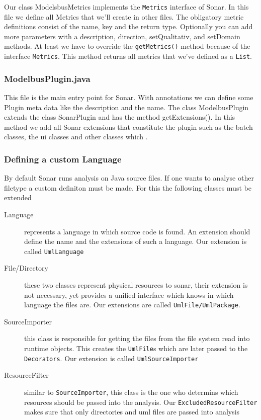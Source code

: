 Our class ModelsbusMetrics implements the \texttt{Metrics} interface of
Sonar. In this file we define all Metrics that we'll create in other
files. The obligatory metric definitions consist of the name, key and
the return type. Optionally you can add more parameters with a
description, direction, setQualitativ, and setDomain methods. At least
we have to override the \texttt{getMetrics()} method because of the interface
\texttt{Metrics}. This method returns all metrics that we've defined
as a \texttt{List}.

\subsubsection{ModelbusPlugin.java}

This file is the main entry point for Sonar. With annotations we can
define some Plugin meta data like the description and the name. The
class ModelbusPlugin extends the class SonarPlugin and has the method
getExtensions(). In this method we add all Sonar extensions that 
constitute the plugin such as the batch classes, the ui classes and
other classes which .

\subsubsection{Defining a custom Language}

By default Sonar runs analysis on Java source files. If one
wants to analyse other filetype a custom definiton must be made.
For this the following classes must be extended

\begin{description}
  \item[Language] represents a language in which source code is
    found. An extension should define the name and the extensions of
    such a language. Our extension is called \texttt{UmlLanguage}
  \item[File/Directory] these two classes represent physical resources
    to sonar, their extension is not necessary, yet provides a unified
    interface which knows in which language the files are. Our
    extensions are called \texttt{UmlFile/UmlPackage}.
  \item[SourceImporter] this class is responsible for getting the
    files from the file system read into runtime objects. This creates
    the \texttt{UmlFile}s which are later passed to the
    \texttt{Decorators}. Our extension is called \texttt{UmlSourceImporter}
  \item[ResourceFilter] similar to \texttt{SourceImporter}, this class
    is the one who determins which resources should be passed into the
    analysis.  Our \texttt{ExcludedResourceFilter} makes sure that
    only directories and uml files are passed into analysis
\end{description}

